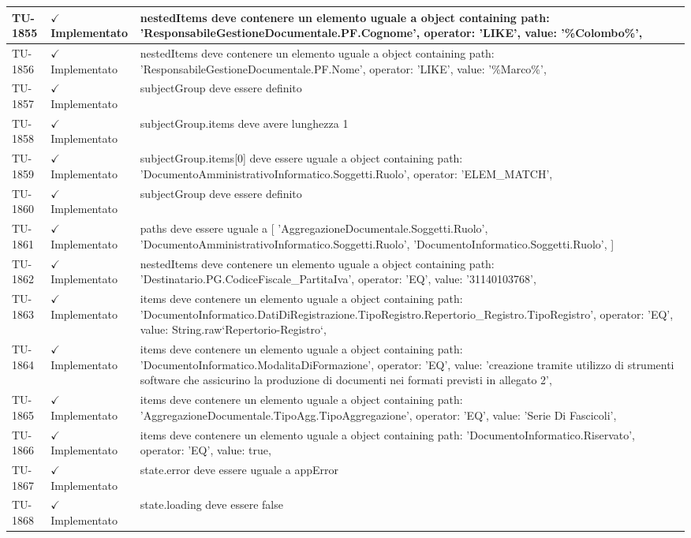 ﻿\documentclass[a4paper,12pt]{article}
\newcommand{\ok}{\textcolor{green!60!black}{$\checkmark$ Implementato}}
\begin{document}
\begin{longtable}{|p{2cm}|p{3.5cm}|p{9.5cm}|}
\hline
TU-1855 & \ok & nestedItems deve contenere un elemento uguale a object containing { path: 'ResponsabileGestioneDocumentale.PF.Cognome', operator: 'LIKE', value: '\%Colombo\%', } \\
\hline
TU-1856 & \ok & nestedItems deve contenere un elemento uguale a object containing { path: 'ResponsabileGestioneDocumentale.PF.Nome', operator: 'LIKE', value: '\%Marco\%', } \\
\hline
TU-1857 & \ok & subjectGroup deve essere definito \\
\hline
TU-1858 & \ok & subjectGroup.items deve avere lunghezza 1 \\
\hline
TU-1859 & \ok & subjectGroup.items[0] deve essere uguale a object containing { path: 'DocumentoAmministrativoInformatico.Soggetti.Ruolo', operator: 'ELEM\_MATCH', } \\
\hline
TU-1860 & \ok & subjectGroup deve essere definito \\
\hline
TU-1861 & \ok & paths deve essere uguale a [ 'AggregazioneDocumentale.Soggetti.Ruolo', 'DocumentoAmministrativoInformatico.Soggetti.Ruolo', 'DocumentoInformatico.Soggetti.Ruolo', ] \\
\hline
TU-1862 & \ok & nestedItems deve contenere un elemento uguale a object containing { path: 'Destinatario.PG.CodiceFiscale\_PartitaIva', operator: 'EQ', value: '31140103768', } \\
\hline
TU-1863 & \ok & items deve contenere un elemento uguale a object containing { path: 'DocumentoInformatico.DatiDiRegistrazione.TipoRegistro.Repertorio\_Registro.TipoRegistro', operator: 'EQ', value: String.raw`Repertorio-Registro`, } \\
\hline
TU-1864 & \ok & items deve contenere un elemento uguale a object containing { path: 'DocumentoInformatico.ModalitaDiFormazione', operator: 'EQ', value: 'creazione tramite utilizzo di strumenti software che assicurino la produzione di documenti nei formati previsti in allegato 2', } \\
\hline
TU-1865 & \ok & items deve contenere un elemento uguale a object containing { path: 'AggregazioneDocumentale.TipoAgg.TipoAggregazione', operator: 'EQ', value: 'Serie Di Fascicoli', } \\
\hline
TU-1866 & \ok & items deve contenere un elemento uguale a object containing { path: 'DocumentoInformatico.Riservato', operator: 'EQ', value: true, } \\
\hline
TU-1867 & \ok & state.error deve essere uguale a appError \\
\hline
TU-1868 & \ok & state.loading deve essere false \\

\end{longtable}
\end{document}
